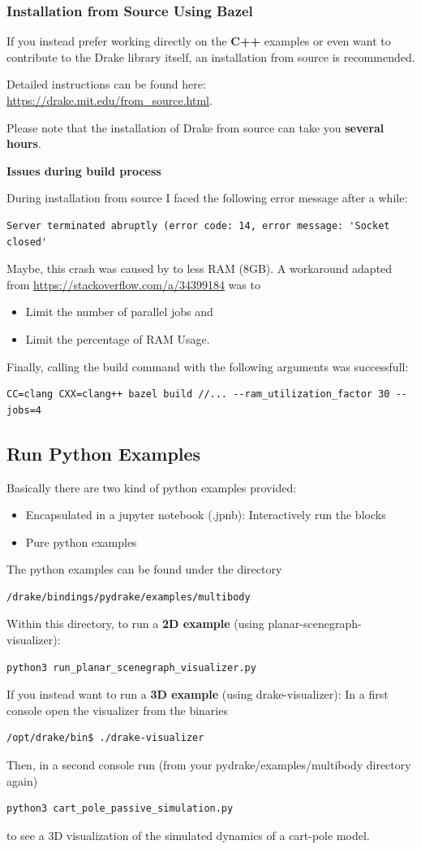 \subsubsection{Installation from Source Using Bazel}
If you instead prefer working directly on the \textbf{C++} examples or even want to contribute to the Drake library itself, an installation from source is recommended. 

Detailed instructions can be found here: \url{https://drake.mit.edu/from_source.html}.

Please note that the installation of Drake from source can take you \textbf{several hours}. 

\textbf{Issues during build process}

During installation from source I faced the following error message after a while:
\begin{verbatim}
Server terminated abruptly (error code: 14, error message: 'Socket closed'
\end{verbatim}
Maybe, this crash was caused by to less RAM (8GB). A workaround adapted from \url{https://stackoverflow.com/a/34399184} was to 
\begin{itemize}
\item Limit the number of parallel jobs and 
\item Limit the percentage of RAM Usage.
\end{itemize}
Finally, calling the build command with the following arguments was successfull:
\begin{verbatim}
CC=clang CXX=clang++ bazel build //... --ram_utilization_factor 30 --jobs=4
\end{verbatim}

\subsection{Run Python Examples}
Basically there are two kind of python examples provided:
\begin{itemize}
\item Encapsulated in a jupyter notebook (.jpnb): Interactively run the blocks
\item Pure python examples
\end{itemize}
The python examples can be found under the directory
\begin{verbatim}
/drake/bindings/pydrake/examples/multibody
\end{verbatim}
Within this directory, to run a \textbf{2D example} (using planar-scenegraph-visualizer):
\begin{verbatim}
python3 run_planar_scenegraph_visualizer.py
\end{verbatim}
If you instead want to run a \textbf{3D example} (using drake-visualizer):
In a first console open the visualizer from the binaries
\begin{verbatim}
/opt/drake/bin$ ./drake-visualizer
\end{verbatim}
Then, in a second console run (from your pydrake/examples/multibody directory again)
\begin{verbatim}
python3 cart_pole_passive_simulation.py
\end{verbatim}
to see a 3D visualization of the simulated dynamics of a cart-pole model.

